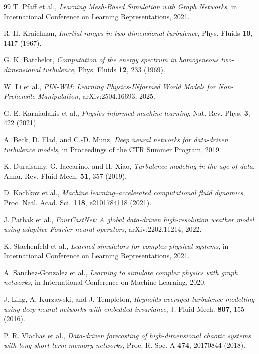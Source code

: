 \documentclass[reprint,aps,pre]{revtex4-2}
\begin{document}
\begin{thebibliography}{99}
T. Pfaff et al., \textit{Learning Mesh-Based Simulation with Graph Networks}, in International Conference on Learning Representations, 2021.

R. H. Kraichnan, \textit{Inertial ranges in two-dimensional turbulence}, Phys. Fluids \textbf{10}, 1417 (1967).

G. K. Batchelor, \textit{Computation of the energy spectrum in homogeneous two-dimensional turbulence}, Phys. Fluids \textbf{12}, 233 (1969).

W. Li et al., \textit{PIN-WM: Learning Physics-INformed World Models for Non-Prehensile Manipulation}, arXiv:2504.16693, 2025.

G. E. Karniadakis et al., \textit{Physics-informed machine learning}, Nat. Rev. Phys. \textbf{3}, 422 (2021).

A. Beck, D. Flad, and C.-D. Munz, \textit{Deep neural networks for data-driven turbulence models}, in Proceedings of the CTR Summer Program, 2019.

K. Duraisamy, G. Iaccarino, and H. Xiao, \textit{Turbulence modeling in the age of data}, Annu. Rev. Fluid Mech. \textbf{51}, 357 (2019).

D. Kochkov et al., \textit{Machine learning--accelerated computational fluid dynamics}, Proc. Natl. Acad. Sci. \textbf{118}, e2101784118 (2021).

J. Pathak et al., \textit{FourCastNet: A global data-driven high-resolution weather model using adaptive Fourier neural operators}, arXiv:2202.11214, 2022.

K. Stachenfeld et al., \textit{Learned simulators for complex physical systems}, in International Conference on Learning Representations, 2021.

A. Sanchez-Gonzalez et al., \textit{Learning to simulate complex physics with graph networks}, in International Conference on Machine Learning, 2020.

J. Ling, A. Kurzawski, and J. Templeton, \textit{Reynolds averaged turbulence modelling using deep neural networks with embedded invariance}, J. Fluid Mech. \textbf{807}, 155 (2016).

P. R. Vlachas et al., \textit{Data-driven forecasting of high-dimensional chaotic systems with long short-term memory networks}, Proc. R. Soc. A \textbf{474}, 20170844 (2018).


\end{thebibliography}
\end{document}
